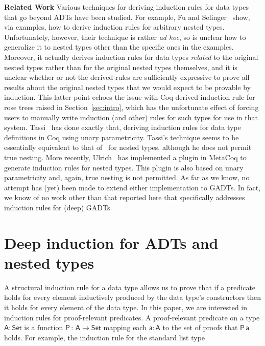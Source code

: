 \documentclass[9pt]{entcs}
\begin{document}
{\bf Related Work\/}
Various techniques for deriving induction rules for data types that go
beyond ADTs have been studied. For example, Fu and
Selinger~\cite{fs18} show, via examples, how to derive induction rules
for arbitrary nested types. Unfortunately, however, their technique is
rather {\em ad hoc}, so is unclear how to generalize it to nested
types other than the specific ones in the examples. Moreover, it
actually derives induction rules for data types {\em related} to the
original nested types rather than for the original nested types
themselves, and it is unclear whether or not the derived rules are
sufficiently expressive to prove all results about the original nested
types that we would expect to be provable by induction. This latter
point echoes the issue with Coq-derived induction rule for rose trees
raised in Section~\ref{sec:intro}, which has the unfortunate effect of
forcing users to manually write induction (and other) rules for such
types for use in that system. Tassi~\cite{tas19} has done exactly
that, deriving induction rules for data type definitions in Coq using
unary parametricity. Tassi's technique seems to be essentially
equivalent to that of~\cite{jp19} for nested types, although he does
not permit true nesting. More recently, Ulrich~\cite{ull20} has
implemented a plugin in MetaCoq to generate induction rules for nested
types. This plugin is also based on unary parametricity and, again,
true nesting is not permitted.  {\color{red} As far as we know, no
  attempt has (yet) been made to extend either implementation to
  GADTs.} In fact, we know of no work other than that reported here
that specifically addresses induction rules for (deep) GADTs.

\section{Deep induction for ADTs and nested types}\label{sec:ADTs-and-nesteds}

A structural induction rule for a data type allows us to prove that if
a predicate holds for every element inductively produced by the data
type's constructors then it holds for every element of the data type.
In this paper, we are interested in induction rules for proof-relevant
predicates.  A proof-relevant predicate on a type $\mathsf{A : Set}$
is a function $\mathsf{P\,:\,A \to Set}$ mapping each $\mathsf{a : A}$
to the set of proofs that $\mathsf{P\,a}$ holds.  For example, the
induction rule for the standard list type

\vspace*{-0.1in}
\end{document}
